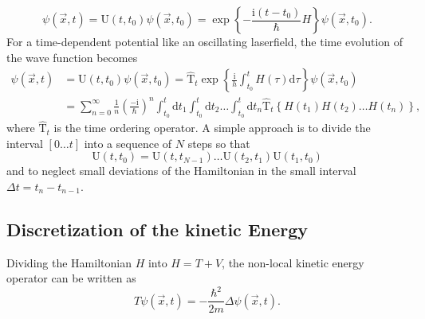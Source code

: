\documentclass[10pt,a4paper]{article} %
\renewcommand{\i}{{\mathrm{i}}}
\renewcommand{\d}{\mathrm{d}}
\begin{document}
   \begin{equation}
     \psi(\vec{x}, t) = \text{U}(t, t_0) \psi(\vec{x}, t_0)   = \exp \left\{ - \frac{\i (t-t_0) }{\hbar} H \right\}  \psi(\vec{x}, t_0) \text{.}
   \end{equation} 
   For a time-dependent potential like an oscillating laserfield, the time evolution of the wave function becomes
   \begin{align}
   \psi(\vec{x}, t) &= \text{U}(t, t_0) \psi(\vec{x}, t_0)  = \hat{\text{T}}_t  \exp \left\{ \frac{\i}{h} \int_{t_0}^t H(\tau) \d \tau \right \}  \psi(\vec{x}, t_0)  \\
   &=  \sum_{n = 0}^\infty \frac{1}{n} {\left( \frac{- \i}{\hbar} \right) }^n \int_{t_0}^t \d t_1\int_{t_0}^t \d t_2 \dots \int_{t_0}^t \d t_n \hat{\text{T}}_t \left\{ H(t_1)H(t_2) \dots H(t_n) \right\} \text{,} \nonumber
   \end{align} 
   where $\hat{\text{T}}_t$ is the time ordering operator. A simple approach is to divide the interval $[0 \dots t]$ into a sequence of $N$ steps so that
   \begin{equation}
   \text{U}(t, t_0) = \text{U}(t, t_{N-1}) \dots \text{U}(t_2, t_1)\text{U}(t_1, t_0)
\end{equation}   and to neglect small deviations of the Hamiltonian in the small interval $\Delta t = t_n - t_{n-1}$.
   
    \subsection{Discretization of the kinetic Energy}
    Dividing the Hamiltonian $H$ into $H = T + V$, the non-local kinetic energy operator can be written as
    \begin{equation}
    T \psi(\vec{x}, t) = - \frac{\hbar^2}{2m} \Delta \psi(\vec{x}, t) \text{.}
    \end{equation}
    
\end{document}
